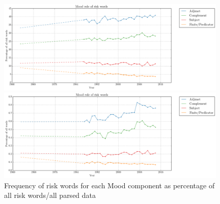                       \noindent
          \begin{figure}[htb!]
          \centering
          \begin{minipage}{.48\textwidth}
            \centering
            \includegraphics[width=0.98\textwidth]{../images/mood_role_of_risk_words.png}
          \end{minipage}%
          \begin{minipage}{.48\textwidth}
            \centering
            \includegraphics[width=0.98\textwidth]{../images/riskdep_allwords.png}
           \end{minipage}
            \caption{Frequency of risk words for each Mood component as percentage of all risk words\slash all parsed data}
            \label{fig:interpersonalarg}
          \end{figure}



